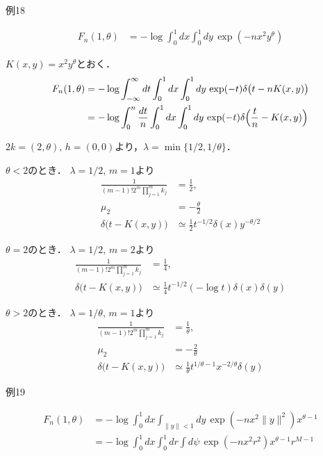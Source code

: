 \documentclass[11pt,a4paper]{jsarticle}
\begin{document}
例18

\begin{align}
F_n (1, \theta)
& =
- \log \int_0^1 dx \int_0^1 dy \, \exp ( -n x^2 y^\theta ) \nonumber
\end{align}

$K(x, y) = x^2 y^\theta$とおく．
\begin{align}
F_n (1, \theta)
& =
- \log \int_{-\infty}^{\infty} dt \int_0^1 dx \int_0^1 dy \, \exp(-t) \delta \bigl( t - n K(x, y) \bigr) \nonumber \\
& =
- \log \int_0^n \frac{dt}{n} \int_0^1 dx \int_0^1 dy \, \exp(-t) \delta \Bigl( \frac{t}{n} - K(x, y) \Bigr) \nonumber
\end{align}

$2k = (2, \theta), \, h = (0, 0)$より，$\lambda = \min \bigl\{ 1/2, 1/\theta \bigr\}$．

$\theta < 2$のとき．
$\lambda = 1/2, \, m = 1$より
\begin{align}
\frac{1}{(m - 1)! 2^m \prod_{j=1}^m k_j}
& =
\frac{1}{2}, \nonumber \\
\mu_2
& =
-\frac{\theta}{2} \nonumber \\
\delta \bigl( t - K(x, y) \bigr)
& \simeq
\frac{1}{2} t^{-1/2} \delta(x) y^{-\theta/2} \nonumber
\end{align}

$\theta = 2$のとき．
$\lambda = 1/2, \, m = 2$より
\begin{align}
\frac{1}{(m - 1)! 2^m \prod_{j=1}^m k_j}
& =
\frac{1}{4}, \nonumber \\
\delta \bigl( t - K(x, y) \bigr)
& \simeq
\frac{1}{4} t^{-1/2} (-\log t) \delta(x) \delta(y) \nonumber
\end{align}

$\theta > 2$のとき．
$\lambda = 1/\theta, \, m = 1$より
\begin{align}
\frac{1}{(m - 1)! 2^m \prod_{j=1}^m k_j}
& =
\frac{1}{\theta}, \nonumber \\
\mu_2
& =
-\frac{2}{\theta} \nonumber \\
\delta \bigl( t - K(x, y) \bigr)
& \simeq
\frac{1}{\theta} t^{1/\theta - 1} x^{-2/\theta} \delta(y) \nonumber
\end{align}

例19

\begin{align}
F_n (1, \theta)
& =
- \log \int_0^1 dx \int_{\| y \| < 1} dy \, \exp ( -n x^2 \| y \|^2 ) x^{\theta - 1} \nonumber \\
& =
- \log \int_0^1 dx \int_0^1 dr \int d \psi \, \exp ( -n x^2 r^2 ) x^{\theta - 1} r^{M - 1} \nonumber
\end{align}
\end{document}
